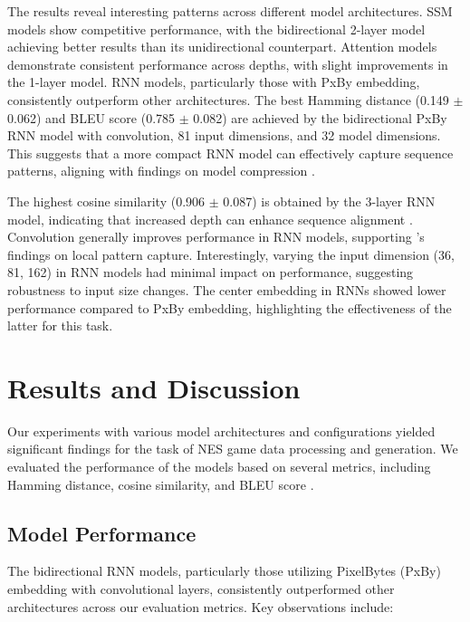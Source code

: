 \documentclass[10pt,a4paper]{article}
\begin{document}
The results reveal interesting patterns across different model architectures. SSM models show competitive performance, with the bidirectional 2-layer model achieving better results than its unidirectional counterpart. Attention models demonstrate consistent performance across depths, with slight improvements in the 1-layer model. RNN models, particularly those with PxBy embedding, consistently outperform other architectures. The best Hamming distance (0.149 $\pm$ 0.062) and BLEU score (0.785 $\pm$ 0.082) are achieved by the bidirectional PxBy RNN model with convolution, 81 input dimensions, and 32 model dimensions. This suggests that a more compact RNN model can effectively capture sequence patterns, aligning with findings on model compression \cite{han2016deep}.

The highest cosine similarity (0.906 $\pm$ 0.087) is obtained by the 3-layer RNN model, indicating that increased depth can enhance sequence alignment \cite{pascanu2014construct}. Convolution generally improves performance in RNN models, supporting \cite{lecun1995convolutional}'s findings on local pattern capture. Interestingly, varying the input dimension (36, 81, 162) in RNN models had minimal impact on performance, suggesting robustness to input size changes. The center embedding in RNNs showed lower performance compared to PxBy embedding, highlighting the effectiveness of the latter for this task.

\section{Results and Discussion}

Our experiments with various model architectures and configurations yielded significant findings for the task of NES game data processing and generation. We evaluated the performance of the models based on several metrics, including Hamming distance, cosine similarity, and BLEU score \cite{papineni2002bleu}.

\subsection{Model Performance}

The bidirectional RNN models, particularly those utilizing PixelBytes (PxBy) embedding with convolutional layers, consistently outperformed other architectures across our evaluation metrics. Key observations include:
\end{document}
